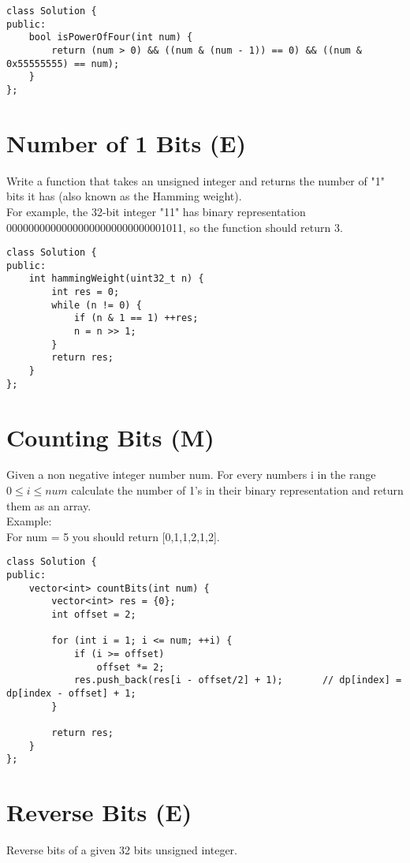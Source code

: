 \begin{lstlisting}
class Solution {
public:
    bool isPowerOfFour(int num) {
        return (num > 0) && ((num & (num - 1)) == 0) && ((num & 0x55555555) == num);
    }
};
\end{lstlisting}


\section{Number of 1 Bits (E)}
Write a function that takes an unsigned integer and returns the number of "1" bits it has (also known as the Hamming weight).\\

For example, the 32-bit integer "11" has binary representation 00000000000000000000000000001011, so the function should return 3.\\

\begin{lstlisting}
class Solution {
public:
    int hammingWeight(uint32_t n) {
        int res = 0;
        while (n != 0) {
            if (n & 1 == 1) ++res;
            n = n >> 1;
        }
        return res;
    }
};
\end{lstlisting}


\section{Counting Bits (M)}
Given a non negative integer number num. For every numbers i in the range $0 \leq i \leq num$ calculate the number of 1's in their binary representation and return them as an array.\\

Example:\\
For num = 5 you should return [0,1,1,2,1,2]. \\

\begin{lstlisting}
class Solution {
public:
    vector<int> countBits(int num) {
        vector<int> res = {0};
        int offset = 2;
        
        for (int i = 1; i <= num; ++i) {                
            if (i >= offset)
                offset *= 2;
            res.push_back(res[i - offset/2] + 1);       // dp[index] = dp[index - offset] + 1;
        }
        
        return res;
    }
};
\end{lstlisting}


\section{Reverse Bits (E)}
Reverse bits of a given 32 bits unsigned integer.\\

